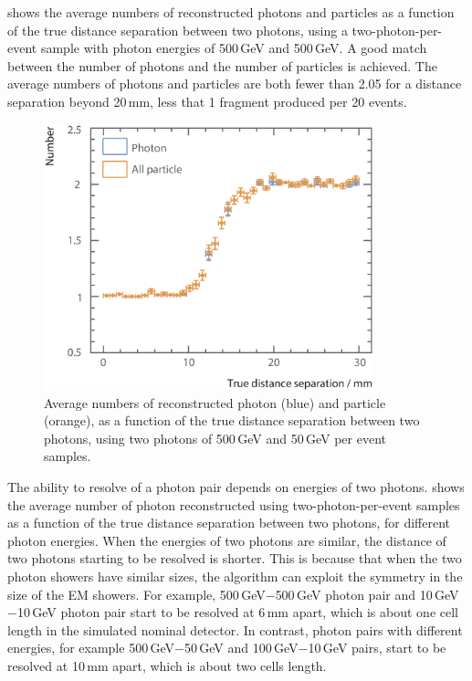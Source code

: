 shows  the average numbers of reconstructed photons and particles  as a function of the true distance separation between two photons, using a two-photon-per-event sample with photon energies of  500\,GeV and 500\,GeV. A good match between the number of photons and the number of particles is achieved. The average numbers of photons and particles are  both fewer than 2.05 for a distance separation beyond 20\,mm, less that 1 fragment produced per 20 events.



\begin{figure}[tbph]
\centering
        \includegraphics[width=0.85\textwidth]{photon/DoubleN_pN_all2}
        \caption{Average numbers of reconstructed photon  (blue) and particle (orange), as a function of the true distance separation between two photons, using two photons of 500\,GeV and 50\,GeV per event samples. }
        \label{fig:photonDoubleCompareN_pN_all}
\end{figure}

The ability to  resolve of a photon pair depends on energies of two photons.  shows the average number of photon reconstructed using two-photon-per-event samples as a function of the true distance separation between two photons, for different photon energies. When the energies of two photons are similar, the distance of two photons starting to be resolved is shorter. This is because that when the two photon showers have similar sizes, the \peakFinding algorithm can exploit the symmetry in the size of the EM showers. For example, 500\,GeV$-$500\,GeV photon pair and 10\,GeV$-$10\,GeV photon pair start to be resolved at 6\,mm apart, which is about one \ECAL cell length in the simulated nominal \ILD detector. In contrast, photon pairs with different energies, for example 500\,GeV$-$50\,GeV and  100\,GeV$-$10\,GeV pairs, start to be resolved at 10\,mm apart, which is about two \ECAL cells length.

